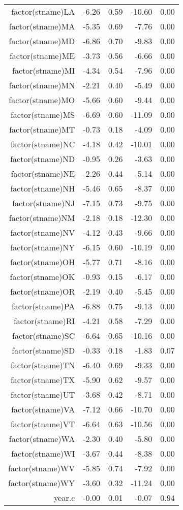 \begin{table}[ht]
\begin{tabular}{rrrrr}
  factor(stname)LA & -6.26 & 0.59 & -10.60 & 0.00 \\ 
  factor(stname)MA & -5.35 & 0.69 & -7.76 & 0.00 \\ 
  factor(stname)MD & -6.86 & 0.70 & -9.83 & 0.00 \\ 
  factor(stname)ME & -3.73 & 0.56 & -6.66 & 0.00 \\ 
  factor(stname)MI & -4.34 & 0.54 & -7.96 & 0.00 \\ 
  factor(stname)MN & -2.21 & 0.40 & -5.49 & 0.00 \\ 
  factor(stname)MO & -5.66 & 0.60 & -9.44 & 0.00 \\ 
  factor(stname)MS & -6.69 & 0.60 & -11.09 & 0.00 \\ 
  factor(stname)MT & -0.73 & 0.18 & -4.09 & 0.00 \\ 
  factor(stname)NC & -4.18 & 0.42 & -10.01 & 0.00 \\ 
  factor(stname)ND & -0.95 & 0.26 & -3.63 & 0.00 \\ 
  factor(stname)NE & -2.26 & 0.44 & -5.14 & 0.00 \\ 
  factor(stname)NH & -5.46 & 0.65 & -8.37 & 0.00 \\ 
  factor(stname)NJ & -7.15 & 0.73 & -9.75 & 0.00 \\ 
  factor(stname)NM & -2.18 & 0.18 & -12.30 & 0.00 \\ 
  factor(stname)NV & -4.12 & 0.43 & -9.66 & 0.00 \\ 
  factor(stname)NY & -6.15 & 0.60 & -10.19 & 0.00 \\ 
  factor(stname)OH & -5.77 & 0.71 & -8.16 & 0.00 \\ 
  factor(stname)OK & -0.93 & 0.15 & -6.17 & 0.00 \\ 
  factor(stname)OR & -2.19 & 0.40 & -5.45 & 0.00 \\ 
  factor(stname)PA & -6.88 & 0.75 & -9.13 & 0.00 \\ 
  factor(stname)RI & -4.21 & 0.58 & -7.29 & 0.00 \\ 
  factor(stname)SC & -6.64 & 0.65 & -10.16 & 0.00 \\ 
  factor(stname)SD & -0.33 & 0.18 & -1.83 & 0.07 \\ 
  factor(stname)TN & -6.40 & 0.69 & -9.33 & 0.00 \\ 
  factor(stname)TX & -5.90 & 0.62 & -9.57 & 0.00 \\ 
  factor(stname)UT & -3.68 & 0.42 & -8.71 & 0.00 \\ 
  factor(stname)VA & -7.12 & 0.66 & -10.70 & 0.00 \\ 
  factor(stname)VT & -6.64 & 0.63 & -10.56 & 0.00 \\ 
  factor(stname)WA & -2.30 & 0.40 & -5.80 & 0.00 \\ 
  factor(stname)WI & -3.67 & 0.44 & -8.38 & 0.00 \\ 
  factor(stname)WV & -5.85 & 0.74 & -7.92 & 0.00 \\ 
  factor(stname)WY & -3.60 & 0.32 & -11.24 & 0.00 \\ 
  year.c & -0.00 & 0.01 & -0.07 & 0.94 \\ 
   \hline
\end{tabular}
\end{table}
